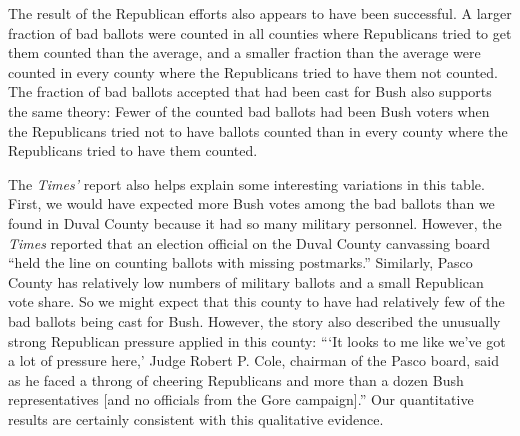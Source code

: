 \documentclass[11pt,titlepage]{article}
\begin{document}
The result of the Republican efforts also appears to have been
successful.  A larger fraction of bad ballots were counted in all
counties where Republicans tried to get them counted than the average,
and a smaller fraction than the average were counted in every county
where the Republicans tried to have them not counted.  
The fraction of bad ballots accepted that had been cast for Bush also
supports the same theory: Fewer of the counted bad ballots had been
Bush voters when the Republicans tried not to have ballots counted
than in every county where the Republicans tried to have them counted.

The \emph{Times'} report also helps explain some interesting
variations in this table.  First, we would have expected more Bush
votes among the bad ballots than we found in Duval County because it
had so many military personnel.  However, the \emph{Times} reported
that an election official on the Duval County canvassing board ``held
the line on counting ballots with missing postmarks.''  Similarly,
Pasco County has relatively low numbers of military ballots and a
small Republican vote share.  So we might expect that this county to
have had relatively few of the bad ballots being cast for Bush.
However, the story also described the unusually strong Republican
pressure applied in this county: ```It looks to me like we've got a
lot of pressure here,' Judge Robert P.  Cole, chairman of the Pasco
board, said as he faced a throng of cheering Republicans and more than
a dozen Bush representatives [and no officials from the Gore
campaign].''  Our quantitative results are certainly consistent with
this qualitative evidence.
\end{document}
